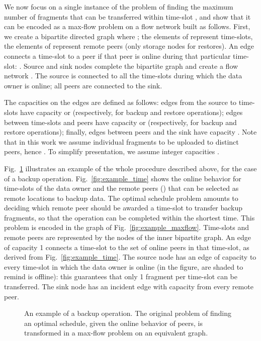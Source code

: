 \documentclass[conference,10pt]{IEEEtran}
\begin{document}
We now focus on a single instance of the problem of finding the
maximum number of fragments  that can be transferred within
time-slot , and show that it can be encoded as a max-flow problem
on a flow network built as follows.  First, we create a bipartite
directed graph  where ;
the elements of 
represent time-slots, the elements of  represent remote peers (only storage nodes for
restores). An edge connects a time-slot to a peer if that peer is
online during that particular time-slot: . Source  and sink 
nodes complete the bipartite graph  and create a flow network
. The source is connected to all the time-slots during which
the data owner  is online; all peers are connected to the sink.

The capacities on the edges are defined as follows: edges from the source to time-slots have capacity  or  (respectively, for backup and restore operations); edges between time-slots and peers have capacity  or  (respectively, for backup and restore operations); finally, edges between peers and the sink have capacity . Note that in this work we assume individual fragments to be uploaded to distinct peers, hence . To simplify presentation, we assume integer capacities .

Fig.~\ref{fig:maxflow} illustrates an example of the whole procedure
described above, for the case of a backup
operation. Fig.~\ref{fig:example_time} shows the online behavior for
time-slots  of the data owner and the remote peers
() that can be selected as remote locations to backup
data. The optimal schedule problem amounts to deciding which remote
peer should be awarded a time-slot to transfer backup fragments, so
that the operation can be completed within the shortest time. This
problem is encoded in the graph of
Fig.~\ref{fig:example_maxflow}. Time-slots and remote peers are
represented by the nodes of the inner bipartite graph. An edge of
capacity 1 connects a time-slot to the set of online peers in that
time-slot, as derived from Fig.~\ref{fig:example_time}. The source
node has an edge of capacity  to every time-slot in which the
data owner is online (in the figure,  are shaded to remind
 is offline): this guarantees that only 1 fragment per time-slot
can be transferred. The sink node has an incident edge with capacity
 from every remote peer.

\begin{figure}
\centering
	
	
	\caption{An example of a backup operation. The original problem of finding an optimal schedule, given the online behavior of peers, is transformed in a max-flow problem on an equivalent graph.} \label{fig:maxflow} 
\end{figure}
\end{document}
